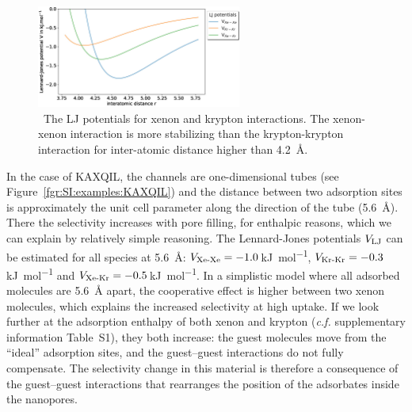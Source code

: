 \documentclass[main.tex]{subfiles}
\begin{document}
  \begin{figure}[ht]
    \centering
      \includegraphics[width=0.6\textwidth]{figures/2-thermo/lennard_jones.jpg}
      \caption{\ The LJ potentials for xenon and krypton interactions. The xenon-xenon interaction is more stabilizing than the krypton-krypton interaction for inter-atomic distance higher than \SI{4.2}{\angstrom}.}
      \label{fgr:LJ}
    \end{figure}
  
  In the case of KAXQIL, the channels are one-dimensional tubes (see Figure~\ref{fgr:SI:examples:KAXQIL}) and the distance between two adsorption sites is approximately the unit cell parameter along the direction of the tube (\SI{5.6}{\angstrom}). There the selectivity increases with pore filling, for enthalpic reasons, which we can explain by relatively simple reasoning. The Lennard-Jones potentials $V_{\text{LJ}}$ can be estimated for all species at \SI{5.6}{\angstrom}: $V_{\text{Xe-Xe}}=-1.0$\,\si{\kilo\joule\per\mol}, $V_{\text{Kr-Kr}}=-0.3$\,\si{\kilo\joule\per\mol} and $V_{\text{Xe-Kr}}=-0.5$\,\si{\kilo\joule\per\mol}. In a simplistic model where all adsorbed molecules are \SI{5.6}{\angstrom} apart, the cooperative effect is higher between two xenon molecules, which explains the increased selectivity at high uptake. If we look further at the adsorption enthalpy of both xenon and krypton (\emph{c.f.} supplementary information Table~S1), they both increase: the guest molecules move from the ``ideal'' adsorption sites, and the guest--guest interactions do not fully compensate. The selectivity change in this material is therefore a consequence of the guest--guest interactions that rearranges the position of the adsorbates inside the nanopores.
  
\end{document}

